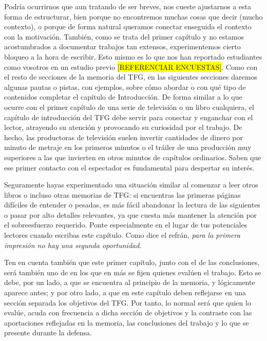 Podría ocurrirnos que aun tratando de ser breves, nos cueste ajustarnos a esta forma de estructurar, bien porque no encontremos muchas cosas que decir (mucho contexto), o porque de forma natural queramos conectar enseguida el contexto con la motivación. También, como se trata del primer capítulo y no estamos acostumbrados a documentar trabajos tan extensos, experimentemos cierto bloqueo a la hora de escribir. Esto mismo es lo que nos han reportado estudiantes como vosotros en un estudio previo \colorbox{yellow}{[REFERENCIAR ENCUESTAS]}. Como con el resto de secciones de la memoria del TFG, en las siguientes secciones daremos algunas pautas o pistas, con ejemplos, sobre cómo abordar o con qué tipo de contenidos completar el capítulo de Introducción. De forma similar a lo que ocurre con el primer capítulo de una serie de televisión o un libro cualquiera, el capítulo de introducción del TFG debe servir para conectar y enganchar con el lector, atrayendo su atención y provocando su curiosidad por el trabajo. De hecho, las productoras de televisión suelen invertir cantidades de dinero por minuto de metraje en los primeros minutos o el tráiler de una producción muy superiores a las que invierten en otros minutos de capítulos ordinarios. Saben que ese primer contacto con el espectador es fundamental para despertar su interés.

Seguramente hayas experimentado una situación similar al comenzar a leer otros libros o incluso otras memorias de TFG: si encuentras las primeras páginas difíciles de entender o pesadas, es más fácil abandonar la lectura de las siguientes o pasar por alto detalles relevantes, ya que cuesta más mantener la atención por el sobreesfuerzo requerido. Ponte especialmente en el lugar de tus potenciales lectores cuando escribas este capítulo. Como dice el refrán, \textit{para la primera impresión no hay una segunda oportunidad}.

Ten en cuenta también que este primer capítulo, junto con el de las conclusiones, será también uno de en los que en más se fijen quienes evalúen el trabajo. Esto se debe, por un lado, a que se encuentra al principio de la memoria, y lógicamente aparece antes; y por otro lado, a que en este capítulo deben reflejarse en una sección separada los objetivos del TFG. Por tanto, lo normal será que quien lo evalúe, acuda con frecuencia a dicha sección de objetivos y la contraste con las aportaciones reflejadas en la memoria, las conclusiones del trabajo y lo que se presente durante la defensa. 

